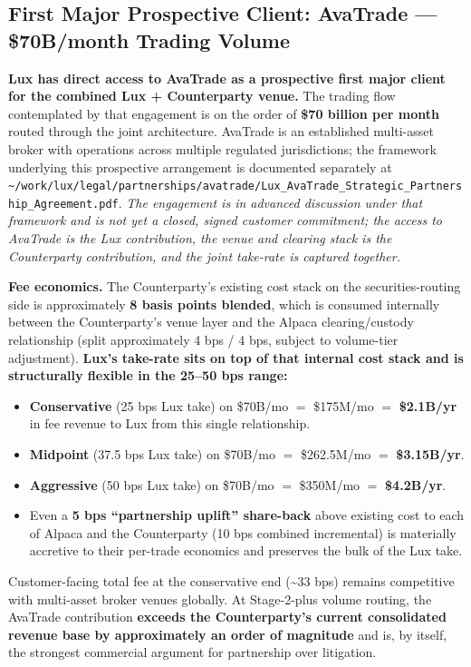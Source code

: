 \documentclass[11pt,letterpaper]{article}
\begin{document}
\subsection*{First Major Prospective Client: AvaTrade --- \$70B/month Trading Volume}

\textbf{Lux has direct access to AvaTrade as a prospective first
major client for the combined Lux + Counterparty venue.} The trading
flow contemplated by that engagement is on the order of \textbf{\$70
billion per month} routed through the joint architecture. AvaTrade
is an established multi-asset broker with operations across multiple
regulated jurisdictions; the framework underlying this prospective
arrangement is documented separately at
\texttt{\textasciitilde/work/lux/legal/partnerships/avatrade/Lux\_AvaTrade\_Strategic\_Partnership\_Agreement.pdf}.
\textit{The engagement is in advanced discussion under that framework
and is not yet a closed, signed customer commitment; the access to
AvaTrade is the Lux contribution, the venue and clearing stack is
the Counterparty contribution, and the joint take-rate is captured
together.}

\textbf{Fee economics.} The Counterparty's existing cost stack on
the securities-routing side is approximately \textbf{8 basis points
blended}, which is consumed internally between the Counterparty's
venue layer and the Alpaca clearing/custody relationship (split
approximately 4 bps / 4 bps, subject to volume-tier adjustment).
\textbf{Lux's take-rate sits on top of that internal cost stack and
is structurally flexible in the 25--50 bps range:}

\begin{itemize}[leftmargin=2em,itemsep=0.1em]
\item \textbf{Conservative} (25 bps Lux take) on \$70B/mo
$=$ \$175M/mo $=$ \textbf{\$2.1B/yr} in fee revenue to Lux from this
single relationship.
\item \textbf{Midpoint} (37.5 bps Lux take) on \$70B/mo $=$ \$262.5M/mo
$=$ \textbf{\$3.15B/yr}.
\item \textbf{Aggressive} (50 bps Lux take) on \$70B/mo $=$ \$350M/mo
$=$ \textbf{\$4.2B/yr}.
\item Even a \textbf{5 bps ``partnership uplift'' share-back} above
existing cost to each of Alpaca and the Counterparty (10 bps combined
incremental) is materially accretive to their per-trade economics and
preserves the bulk of the Lux take.
\end{itemize}

Customer-facing total fee at the conservative end (\textasciitilde 33
bps) remains competitive with multi-asset broker venues globally. At
Stage-2-plus volume routing, the AvaTrade contribution \textbf{exceeds
the Counterparty's current consolidated revenue base by approximately
an order of magnitude} and is, by itself, the strongest commercial
argument for partnership over litigation.
\end{document}
